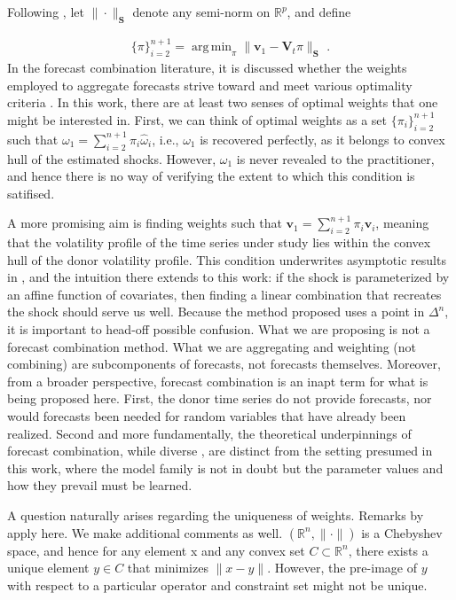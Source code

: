 \documentclass[11pt,3p,review,authoryear]{elsarticle}
\newcommand{\V}{\textbf{V}}
\newcommand{\weight}{\pi}
\DeclareMathOperator*{\argmin}{arg\,min} %
\theoremstyle{definition}
\begin{document}
    Following \citet{abadie2003economic,abadie2010synthetic}, let $\|\cdot\|_{\textbf{S}}$ denote any semi-norm on $\mathbb{R}^{p}$, and define

    \begin{align*}
    \{\pi\}_{i=2}^{n+1} = \argmin_{\pi}\|\textbf{v}_{1} - \V_{t}\pi \|_{\textbf{S}} \text{ .}
    \end{align*}
In the forecast combination literature, it is discussed whether the weights employed to aggregate forecasts strive toward and meet various optimality criteria \citep{timmermann2006forecast,wang2023forecast}.  In this work, there are at least two senses of optimal weights that one might be interested in.  First, we can think of optimal weights as a set $\{\weight_{i}\}_{i=2}^{n+1}$ such that $\omega_{1} = \sum^{n+1}_{i=2}\weight_{i}\hat\omega_{i}$, i.e., $\omega_{1}$ is recovered perfectly, as it belongs to convex hull of the estimated shocks. However, $\omega_{1}$ is never revealed to the practitioner, and hence there is no way of verifying the extent to which this condition is satifised.

A more promising aim is finding weights such that $\textbf{v}_{1} = \sum^{n+1}_{i=2}\weight_{i}\textbf{v}_{i}$, meaning that the volatility profile of the time series under study lies within the convex hull of the donor volatility profile.  This condition underwrites asymptotic results in \citet{abadie2010synthetic}, and the intuition there extends to this work: if the shock is parameterized by an affine function of covariates, then finding a linear combination that recreates the shock should serve us well.  Because the method proposed uses a point in $\Delta^{n}$, it is important to head-off possible confusion.  What we are proposing is not a forecast combination method.  What we are aggregating and weighting (not combining) are subcomponents of forecasts, not forecasts themselves.  Moreover, from a broader perspective, forecast combination is an inapt term for what is being proposed here.  First, the donor time series do not provide forecasts, nor would forecasts been needed for random variables that have already been realized.  Second and more fundamentally, the theoretical underpinnings of forecast combination, while diverse \citep{wang2023forecast}, are distinct from the setting presumed in this work, where the model family is not in doubt but the parameter values and how they prevail must be learned.

A question naturally arises regarding the uniqueness of weights.  Remarks by \cite{lin2021minimizing, abadie2022synthetic} apply here.  We make additional comments as well. $(\mathbb{R}^{n}, \|\cdot\|)$ is a Chebyshev space, and hence for any element x and any convex set $C\subset \mathbb{R}^{n}$, there exists a unique element $y\in C$ that minimizes $\|x-y\|$.  However, the pre-image of $y$ with respect to a particular operator and constraint set might not be unique.
\end{document}
